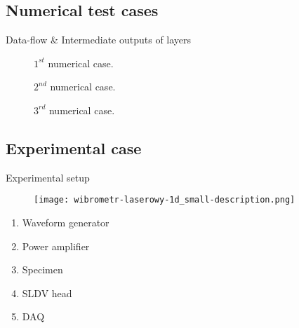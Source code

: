 \documentclass[10pt,aspectratio=169]{beamer} %
\begin{document}
\subsection{Numerical test cases}
\begin{frame}{Data-flow \& Intermediate outputs of layers}
	
	\begin{minipage}[c]{0.32\textwidth}
		\begin{figure}[c]
			\centering
			\caption{\(1^{st}\) numerical case.}
		\end{figure}
	\end{minipage}
	\hfill
	\begin{minipage}[c]{0.32\textwidth}
		\begin{figure}[c]
			\centering
			\caption{\(2^{nd}\) numerical case.}
		\end{figure}
	\end{minipage}
	\hfill
	\begin{minipage}[c]{0.32\textwidth}
		\begin{figure}[c]
			\centering
			\caption{\(3^{rd}\) numerical case.}
		\end{figure}
	\end{minipage}
\end{frame}


\subsection{Experimental case}
\setcounter{subfigure}{0}
\begin{frame}{Experimental setup}
	\begin{minipage}[t]{0.55\textwidth}
		\begin{figure}
			\centering
			\texttt{[image: wibrometr-laserowy-1d\_small-description.png]}
		\end{figure}
	\end{minipage}
	\begin{minipage}[t]{0.4\textwidth}
		\begin{enumerate}
			\item Waveform generator
			\item Power amplifier	
			\item Specimen
			\item SLDV head
			\item DAQ
		\end{enumerate}
	\end{minipage}
\end{frame}
\end{document}
